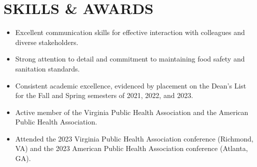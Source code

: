 \documentclass[10pt]{article}
\begin{document}
\vspace{5pt}

\section*{SKILLS \& AWARDS}
\begin{itemize}[leftmargin=0.75cm, noitemsep, topsep=0pt]
    \item Excellent communication skills for effective interaction with colleagues and diverse stakeholders.
    \item Strong attention to detail and commitment to maintaining food safety and sanitation standards.
    \item Consistent academic excellence, evidenced by placement on the Dean's List for the Fall and Spring semesters of 2021, 2022, and 2023.
    \item Active member of the Virginia Public Health Association and the American Public Health Association.
    \item Attended the 2023 Virginia Public Health Association conference (Richmond, VA) and the 2023 American Public Health Association conference (Atlanta, GA).
\end{itemize}
\end{document}
